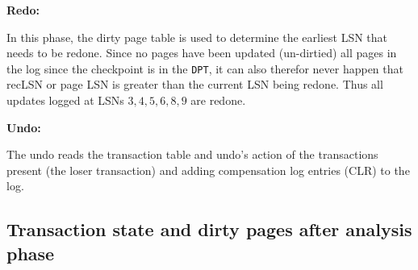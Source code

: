 \iffalse
\begin{enumerate}
\item {\tt LNS: 1} - Start of checkpoint. We here look ahead to find the
{\tt DPT} and {\tt TT}. These are found empty at {\tt LNS: 2}. The log is now
scanned until time of crash.
\item {\tt LNS: 3} - Add {\tt T1} as {\tt U} with LAST\_LSN set to {\tt 3} in {\tt TT} and {\tt P2} to {\tt DPT} with recLSN equal 3.
\item {\tt LNS: 4} - Add {\tt P1} to {\tt DPT} with recLSN equal 4 and change LAST\_LSN of
    {\tt T1} set to 4 in {\tt TT}.
\item {\tt LNS: 5} - Add {\tt T2} at {\tt U} with LAST\_LSN set to {\tt 5}
    to {\tt TT} and {\tt P5} to {\tt DPT} with recLSN equal 5.
\item {\tt LNS: 6} - Add {\tt T3} as {\tt U} with LAST\_LSN set to {\tt 6}
    to {\tt TT} and {\tt P3} to {\tt DPT}  with recLSN equal 6.
\item {\tt LNS: 7} - Change {\tt T3} to {\tt C} and change LAST\_LSN to 7 in {\tt TT}.
\item {\tt LNS: 8} - Change LAST\_LSN of {\tt T2} to 8 in {\tt TT}.
\item {\tt LNS: 9} - Change LAST\_LSN of {\tt T2} to 9 in {\tt TT}.
\item {\tt LNS: 10} - Remove {\tt T3} from {\tt TT}.
\end{enumerate}
\fi

\noindent
{\bf Redo:}

In this phase, the dirty page table is used to determine the earliest LSN that needs to be redone. Since no pages have been updated (un-dirtied) all pages in the log since the checkpoint is in the {\tt DPT}, it can also therefor never happen that recLSN or page LSN is greater than the current LSN being redone. Thus all updates logged at LSNs $3,4,5,6,8,9$ are redone.

\noindent
{\bf Undo:}

The undo reads the transaction table and undo's action of the transactions present (the loser transaction) and adding compensation log entries (CLR) to the log.

\subsection{Transaction state and dirty pages after analysis phase}

